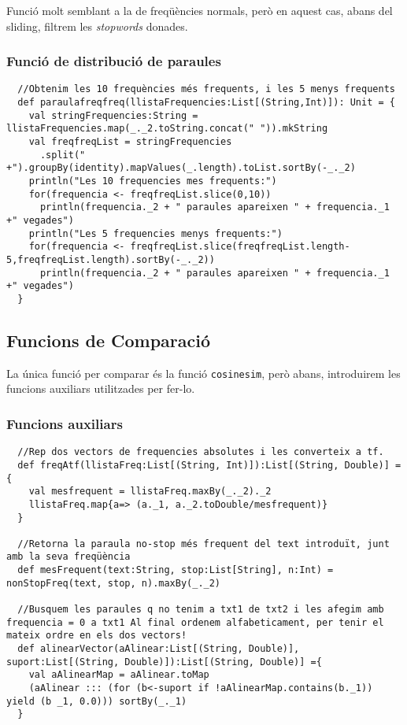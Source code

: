 \documentclass[11pt,a4paper,twoside]{report}
\begin{document}
Funció molt semblant a la de freqüències normals, però en aquest cas, abans del sliding, filtrem les \textit{stopwords} donades.

\subsubsection{Funció de distribució de paraules}
\begin{lstlisting}
  //Obtenim les 10 frequències més frequents, i les 5 menys frequents
  def paraulafreqfreq(llistaFrequencies:List[(String,Int)]): Unit = {
    val stringFrequencies:String = llistaFrequencies.map(_._2.toString.concat(" ")).mkString
    val freqfreqList = stringFrequencies
      .split(" +").groupBy(identity).mapValues(_.length).toList.sortBy(-_._2)
    println("Les 10 frequencies mes frequents:")
    for(frequencia <- freqfreqList.slice(0,10))
      println(frequencia._2 + " paraules apareixen " + frequencia._1 +" vegades")
    println("Les 5 frequencies menys frequents:")
    for(frequencia <- freqfreqList.slice(freqfreqList.length-5,freqfreqList.length).sortBy(-_._2))
      println(frequencia._2 + " paraules apareixen " + frequencia._1 +" vegades")
  }
\end{lstlisting}

\subsection{Funcions de Comparació}

La única funció per comparar és la funció \texttt{cosinesim}, però abans, introduirem les funcions auxiliars utilitzades per fer-lo.

\subsubsection{Funcions auxiliars}

\begin{lstlisting}
  //Rep dos vectors de frequencies absolutes i les converteix a tf.
  def freqAtf(llistaFreq:List[(String, Int)]):List[(String, Double)] = {
    val mesfrequent = llistaFreq.maxBy(_._2)._2
    llistaFreq.map{a=> (a._1, a._2.toDouble/mesfrequent)}
  }

  //Retorna la paraula no-stop més frequent del text introduït, junt amb la seva freqüència
  def mesFrequent(text:String, stop:List[String], n:Int) = nonStopFreq(text, stop, n).maxBy(_._2)

  //Busquem les paraules q no tenim a txt1 de txt2 i les afegim amb frequencia = 0 a txt1 Al final ordenem alfabeticament, per tenir el mateix ordre en els dos vectors!
  def alinearVector(aAlinear:List[(String, Double)], suport:List[(String, Double)]):List[(String, Double)] ={
    val aAlinearMap = aAlinear.toMap
    (aAlinear ::: (for (b<-suport if !aAlinearMap.contains(b._1)) yield (b _1, 0.0))) sortBy(_._1)
  }
\end{lstlisting}
\end{document}
